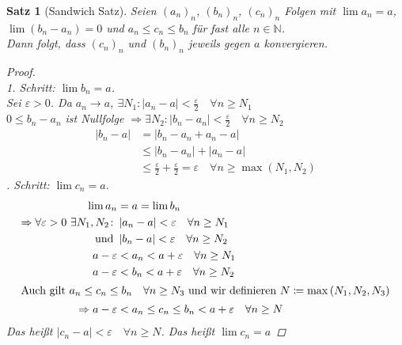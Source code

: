 \documentclass[11pt, twoside, a4paper]{article}
\theoremstyle{plain}
\newtheorem{satz}[blockelement]{Satz}
\newcommand{\pair}[1]{\left(#1\right)}
\newcommand{\abs}[1]{\left|#1\right|}
\newcommand{\impl}[0]{\Rightarrow{}}
\newcommand{\definedas}[0]{\coloneqq}
\newcommand{\fromto}{\rightarrow{}}
\newcommand{\naturalnumbers}{\mathbb{N}}
\begin{document}
    \begin{satz}[Sandwich Satz]
        Seien $(a_n)_n$, $(b_n)_n$, $(c_n)_n$ Folgen mit $\lim a_n = a$, $\lim \pair{b_n-a_n} = 0$ und $a_n \leq c_n \leq b_n$ für fast alle $n\in\naturalnumbers$.\\
        Dann folgt, dass $(c_n)_n$ und $(b_n)_n$ jeweils gegen $a$ konvergieren.
        \begin{proof}
            ~\\
            1. Schritt: $\lim b_n = a$.\\[10pt]
            Sei $\varepsilon > 0$. Da $a_n\fromto a$, $\exists N_1: \abs{a_n-a} < \frac{\varepsilon}{2}\quad\forall n\geq N_1$\\
            $0\leq b_n-a_n$ ist Nullfolge $\impl \exists N_2: \abs{b_n-a_n} < \frac{\varepsilon}{2}\quad\forall n\geq N_2$\\
            \begin{align*}
                \abs{b_n-a} &= \abs{b_n-a_n+a_n-a}\\
                &\leq \abs{b_n - a_n} + \abs{a_n-a}\\
                &\leq \frac{\varepsilon}{2} + \frac{\varepsilon}{2} = \varepsilon\quad \forall n\geq \max\pair{N_1, N_2}
            \end{align*}
            . Schritt: $\lim c_n = a$.
            \begin{align*}
                \lim a_n &= a = \lim b_n\\
                \impl \forall\varepsilon > 0~\exists N_1, N_2\colon &\abs{a_n-a} < \varepsilon \quad\forall n\geq N_1\\
                \text{ und } &\abs{b_n-a} < \varepsilon \quad\forall n\geq N_2\\
                a-\varepsilon &< a_n < a + \varepsilon\quad\forall n\geq N_1\\
                a-\varepsilon &< b_n < a + \varepsilon\quad\forall n\geq N_2\\
                \intertext{Auch gilt $a_n \leq c_n \leq b_n \quad\forall n\geq N_3$ und wir definieren $N\definedas\max\pair{N_1, N_2, N_3}$}
                \impl a-\varepsilon &< a_n \leq c_n \leq b_n < a + \varepsilon\quad\forall n\geq N
            \end{align*}
            Das heißt $\abs{c_n-a} < \varepsilon\quad\forall n\geq N$. Das heißt $\lim c_n = a$\qedhere
        \end{proof}
    \end{satz}
\end{document}
